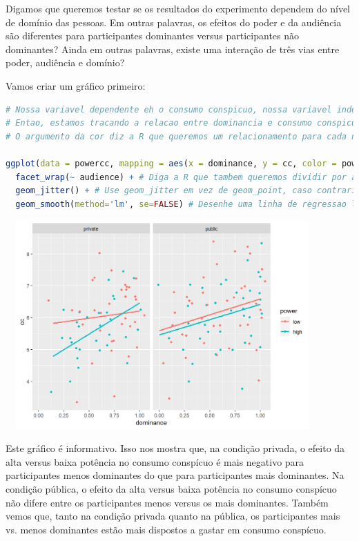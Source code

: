 \documentclass{article}
\begin{document}
Digamos que queremos testar se os resultados do experimento dependem do nível de domínio das pessoas. Em outras palavras, os efeitos do poder e da audiência são diferentes para participantes dominantes versus participantes não dominantes? Ainda em outras palavras, existe uma interação de três vias entre poder, audiência e domínio?

Vamos criar um gráfico primeiro:

\begin{lstlisting}[language=R]
# Nossa variavel dependente eh o consumo conspicuo, nossa variavel independente (no eixo X) eh a dominancia.
# Entao, estamos tracando a relacao entre dominancia e consumo conspicuo.
# O argumento da cor diz a R que queremos um relacionamento para cada nivel de poder.

ggplot(data = powercc, mapping = aes(x = dominance, y = cc, color = power)) + 
  facet_wrap(~ audience) + # Diga a R que tambem queremos dividir por audiencia.
  geom_jitter() + # Use geom_jitter em vez de geom_point, caso contrario, os pontos serao desenhados um sobre o outro
  geom_smooth(method='lm', se=FALSE) # Desenhe uma linha de regressao linear atraves dos pontos.
\end{lstlisting}


\begin{center}
\includegraphics[width=12cm,height=8cm]{bda_interaction_graph-1.png}
\end{center}

Este gráfico é informativo. Isso nos mostra que, na condição privada, o efeito da alta versus baixa potência no consumo conspícuo é mais negativo para participantes menos dominantes do que para participantes mais dominantes. Na condição pública, o efeito da alta versus baixa potência no consumo conspícuo não difere entre os participantes menos versus os mais dominantes. Também vemos que, tanto na condição privada quanto na pública, os participantes mais vs. menos dominantes estão mais dispostos a gastar em consumo conspícuo.
\end{document}
